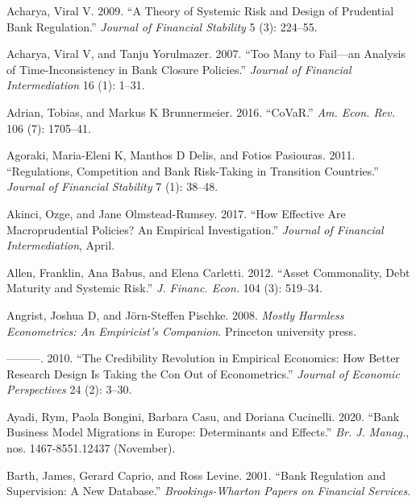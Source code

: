 \documentclass[
  10pt,
]{article}
\begin{document}
\setlength{\parindent}{-0.2in}
\setlength{\leftskip}{0.2in}
\setlength{\parskip}{8pt}
\vspace*{-0.2in}

\noindent

\hypertarget{refs}{}
\leavevmode\hypertarget{ref-Acharya2009}{}%
Acharya, Viral V. 2009. ``A Theory of Systemic Risk and Design of
Prudential Bank Regulation.'' \emph{Journal of Financial Stability} 5
(3): 224--55.

\leavevmode\hypertarget{ref-Acharya2007}{}%
Acharya, Viral V, and Tanju Yorulmazer. 2007. ``Too Many to Fail---an
Analysis of Time-Inconsistency in Bank Closure Policies.'' \emph{Journal
of Financial Intermediation} 16 (1): 1--31.

\leavevmode\hypertarget{ref-Adrian2016}{}%
Adrian, Tobias, and Markus K Brunnermeier. 2016. ``CoVaR.'' \emph{Am.
Econ. Rev.} 106 (7): 1705--41.

\leavevmode\hypertarget{ref-Agoraki2011}{}%
Agoraki, Maria-Eleni K, Manthos D Delis, and Fotios Pasiouras. 2011.
``Regulations, Competition and Bank Risk-Taking in Transition
Countries.'' \emph{Journal of Financial Stability} 7 (1): 38--48.

\leavevmode\hypertarget{ref-Akinci2017}{}%
Akinci, Ozge, and Jane Olmstead-Rumsey. 2017. ``How Effective Are
Macroprudential Policies? An Empirical Investigation.'' \emph{Journal of
Financial Intermediation}, April.

\leavevmode\hypertarget{ref-Allen2012}{}%
Allen, Franklin, Ana Babus, and Elena Carletti. 2012. ``Asset
Commonality, Debt Maturity and Systemic Risk.'' \emph{J. Financ. Econ.}
104 (3): 519--34.

\leavevmode\hypertarget{ref-angrist2008mostly}{}%
Angrist, Joshua D, and Jörn-Steffen Pischke. 2008. \emph{Mostly Harmless
Econometrics: An Empiricist's Companion}. Princeton university press.

\leavevmode\hypertarget{ref-angrist2010credibility}{}%
---------. 2010. ``The Credibility Revolution in Empirical Economics:
How Better Research Design Is Taking the Con Out of Econometrics.''
\emph{Journal of Economic Perspectives} 24 (2): 3--30.

\leavevmode\hypertarget{ref-Ayadi2020}{}%
Ayadi, Rym, Paola Bongini, Barbara Casu, and Doriana Cucinelli. 2020.
``Bank Business Model Migrations in Europe: Determinants and Effects.''
\emph{Br. J. Manag.}, nos. 1467-8551.12437 (November).

\leavevmode\hypertarget{ref-Barth2001}{}%
Barth, James, Gerard Caprio, and Ross Levine. 2001. ``Bank Regulation
and Supervision: A New Database.'' \emph{Brookings-Wharton Papers on
Financial Services}.
\end{document}
